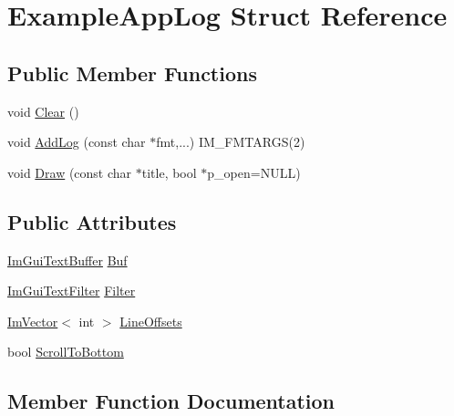\hypertarget{struct_example_app_log}{}\section{Example\+App\+Log Struct Reference}
\label{struct_example_app_log}
\subsection*{Public Member Functions}
\begin{DoxyCompactItemize}
\item 
void \hyperlink{struct_example_app_log_ab9c298defddbb106fdfe4ab16c5eebac}{Clear} ()
\item 
void \hyperlink{struct_example_app_log_afd296fb3b2559acd341fd92883f8f571}{Add\+Log} (const char $\ast$fmt,...) I\+M\+\_\+\+F\+M\+T\+A\+R\+GS(2)
\item 
void \hyperlink{struct_example_app_log_a5ad3a4bdb89171b84aeaff96948a1f77}{Draw} (const char $\ast$title, bool $\ast$p\+\_\+open=N\+U\+LL)
\end{DoxyCompactItemize}
\subsection*{Public Attributes}
\begin{DoxyCompactItemize}
\item 
\hyperlink{struct_im_gui_text_buffer}{Im\+Gui\+Text\+Buffer} \hyperlink{struct_example_app_log_a74fb7cd7bd8c2507b41331ebb7d0e56d}{Buf}
\item 
\hyperlink{struct_im_gui_text_filter}{Im\+Gui\+Text\+Filter} \hyperlink{struct_example_app_log_a4571947a6000e984ec8da9b7166e1e2b}{Filter}
\item 
\hyperlink{class_im_vector}{Im\+Vector}$<$ int $>$ \hyperlink{struct_example_app_log_af197fca7116f9033a5a5e831ee764ee2}{Line\+Offsets}
\item 
bool \hyperlink{struct_example_app_log_a6834b71563c0595e67b78afb6c7ce39d}{Scroll\+To\+Bottom}
\end{DoxyCompactItemize}


\subsection{Member Function Documentation}
\hypertarget{struct_example_app_log_afd296fb3b2559acd341fd92883f8f571}{}\label{struct_example_app_log_afd296fb3b2559acd341fd92883f8f571} 

